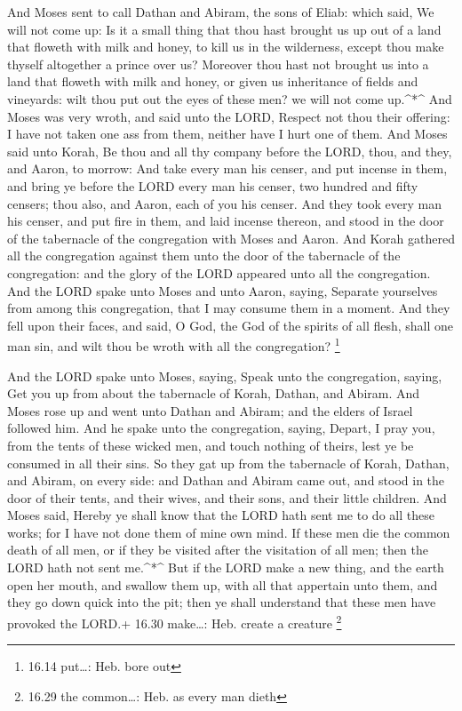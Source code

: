  And Moses sent to call Dathan and Abiram, the sons of
Eliab: which said, We will not come up:  Is it a small
thing that thou hast brought us up out of a land that floweth with milk
and honey, to kill us in the wilderness, except thou make thyself
altogether a prince over us?  Moreover thou hast not
brought us into a land that floweth with milk and honey, or given us
inheritance of fields and vineyards: wilt thou put out the eyes of these
men? we will not come up.\^{}*\^{}  And Moses was very
wroth, and said unto the LORD, Respect not thou their offering: I have
not taken one ass from them, neither have I hurt one of them.
 And Moses said unto Korah, Be thou and all thy company
before the LORD, thou, and they, and Aaron, to morrow:  And
take every man his censer, and put incense in them, and bring ye before
the LORD every man his censer, two hundred and fifty censers; thou also,
and Aaron, each of you his censer.  And they took every man
his censer, and put fire in them, and laid incense thereon, and stood in
the door of the tabernacle of the congregation with Moses and Aaron.
 And Korah gathered all the congregation against them unto
the door of the tabernacle of the congregation: and the glory of the
LORD appeared unto all the congregation.  And the LORD
spake unto Moses and unto Aaron, saying,  Separate
yourselves from among this congregation, that I may consume them in a
moment.  And they fell upon their faces, and said, O God,
the God of the spirits of all flesh, shall one man sin, and wilt thou be
wroth with all the congregation? \footnote{16.14 put\ldots: Heb. bore
  out}

 And the LORD spake unto Moses, saying,  Speak
unto the congregation, saying, Get you up from about the tabernacle of
Korah, Dathan, and Abiram.  And Moses rose up and went unto
Dathan and Abiram; and the elders of Israel followed him. 
And he spake unto the congregation, saying, Depart, I pray you, from the
tents of these wicked men, and touch nothing of theirs, lest ye be
consumed in all their sins.  So they gat up from the
tabernacle of Korah, Dathan, and Abiram, on every side: and Dathan and
Abiram came out, and stood in the door of their tents, and their wives,
and their sons, and their little children.  And Moses said,
Hereby ye shall know that the LORD hath sent me to do all these works;
for I have not done them of mine own mind.  If these men
die the common death of all men, or if they be visited after the
visitation of all men; then the LORD hath not sent me.\^{}*\^{}
 But if the LORD make a new thing, and the earth open her
mouth, and swallow them up, with all that appertain unto them, and they
go down quick into the pit; then ye shall understand that these men have
provoked the LORD.+ 16.30 make\ldots: Heb. create a creature \footnote{16.29
  the common\ldots: Heb. as every man dieth}

